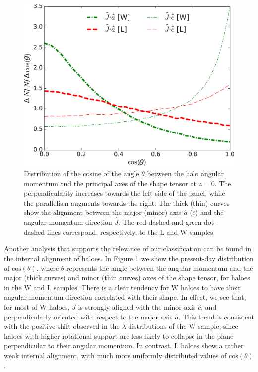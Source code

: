 \documentclass[fleqn,usenatbib]{mnras}
\newcommand{\Wh}{\mathrm{W}}
\newcommand{\Lh}{\mathrm{L}}
\begin{document}
\begin{figure}
	\includegraphics[width=\columnwidth]{400Mpc_figs/JvsAx.pdf}
    \caption{Distribution of the cosine of the angle $\theta$ between the halo angular momentum and the principal axes of the shape tensor at $z=0$. The perpendicularity increases towards the left side of the panel, while the parallelism augments towards the right. The thick (thin) curves show the alignment between the major (minor) axis $\hat{a}$ ($\hat{c}$) and the angular momentum direction $\hat{J}$. The red dashed and green dot-dashed lines correspond, respectively, to the $\Lh$ and $\Wh$ samples.}
    \label{fig:histo_Jxejes}
\end{figure}

Another analysis that supports the relevance of our classification can be found in the internal alignment of haloes. In Figure \ref{fig:histo_Jxejes} we show the present-day distribution of $\mathrm{cos}(\theta)$, where $\theta$ represents the angle between the angular momentum and the major (thick curves) and minor (thin curves) axes of the shape tensor, for haloes in the $\Wh$ and $\Lh$ samples. There is a clear tendency for $\Wh$ haloes to have their angular momentum direction correlated with their shape. In effect, we see that, for most of $\Wh$ haloes, $\hat{J}$ is strongly aligned with the minor axis $\hat{c}$, and perpendicularly oriented with respect to the major axis $\hat{a}$. This trend is consistent with the positive shift observed in the $\lambda$ distributions of the $\Wh$ sample, since haloes with higher rotational support are less likely to collapse in the plane perpendicular to their angular momentum. In contrast, $\Lh$ haloes show a rather weak internal alignment, with much more uniformly distributed values of $\mathrm{cos}(\theta)$. 
\end{document}
